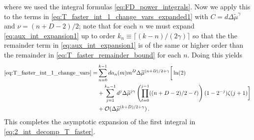 \documentclass[sn-mathphys,Numbered]{sn-jnl}
\begin{document}
where we used the integral formulas \eqref{eq:FD_power_integrals}. Now we apply this to the terms in \eqref{eq:T_faster_int_1_change_vars_expanded1} with $C=d\Delta\widetilde{\mu}^\gamma$ and $\nu=(n+D-2)/2$; note that for each $n$ we must expand \eqref{eq:aux_int_expansion1} up to order $k_n\equiv\lceil(k-n)/(2\gamma)\rceil$ so that the the remainder term in \eqref{eq:aux_int_expansion1} is of  the same or higher order than the remainder in \eqref{eq:T_faster_remainder_bound} for each $n$. Doing this yields
\begin{align}\label{eq:T_faster_int_1_change_vars_expanded2}
\eqref{eq:T_faster_int_1_change_vars} =& \sum_{n=0}^{k-1} da_n(m)m^{D}\Delta\widetilde{\mu}^{(n+D)/2+\gamma}\bigg[
\ln(2)\\
&+\sum_{j=1}^{k_n-1}d^j\Delta\widetilde{\mu}^{j\gamma}  \left(\prod_{\ell=0}^{j-1}((n+D-2)/2-\ell) \right) (1 - 2^{-j})  \zeta(j+1)\bigg]\notag
\\
&+\mathcal{O}(\Delta\widetilde{\mu}^{(k+D)/2+\gamma})\,.\notag
\end{align}
This completes the asymptotic expansion of the first integral in  \eqref{eq:2_int_decomp_T_faster}.
\end{document}
